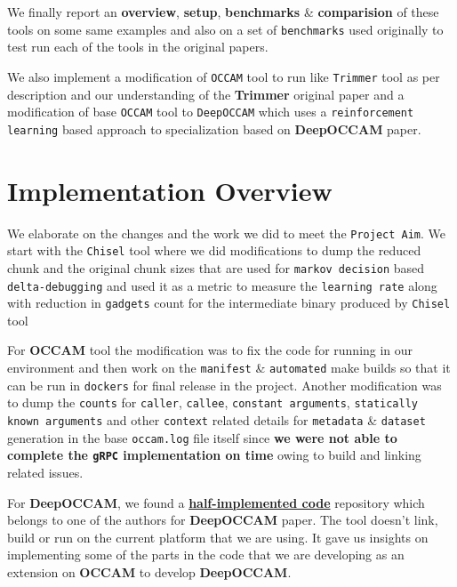 \documentclass{relatorio}
\begin{document}
We finally report an \textbf{overview}, \textbf{setup}, \textbf{benchmarks} \& \textbf{comparision} of these tools on some same 
examples and also on a set of \texttt{benchmarks} used originally to test run each of the tools in the original papers. 

We also implement a modification of \texttt{OCCAM} tool to run like \texttt{Trimmer} tool as per description and our understanding 
of the \textbf{Trimmer} original paper and a modification of base \texttt{OCCAM} tool to \texttt{DeepOCCAM} which uses a 
\texttt{reinforcement learning} based approach to specialization based on \textbf{DeepOCCAM} paper. 

\section{Implementation Overview}%
\label{Tools}

We elaborate on the changes and the work we did to meet the \texttt{Project Aim}. We start with the \texttt{Chisel} tool where we did modifications to dump the reduced chunk and the original chunk sizes that are used for \texttt{markov decision} based \texttt{delta-debugging} and used it as a metric to measure the \texttt{learning rate} along with reduction in \texttt{gadgets} count for the intermediate binary produced by \texttt{Chisel} tool

For \textbf{OCCAM} tool the modification was to fix the code for running in our environment and then work on the \texttt{manifest} \& \texttt{automated} make builds so that it can be run in \texttt{dockers} for final release in the project. Another modification was to dump the \texttt{counts} for \texttt{caller}, \texttt{callee}, \texttt{constant arguments}, \texttt{statically known arguments} and other \texttt{context} related details for 
\texttt{metadata} \& \texttt{dataset} generation in the base \texttt{occam.log} file itself since \textbf{we were not able to complete the \texttt{gRPC} implementation on time} owing to build and linking related issues. 

For \textbf{DeepOCCAM}, we found a \textbf{\href{https://github.com/nhamlv-55/OCCAM/tree/mlpolicy}{half-implemented code}} repository which belongs to one of the authors for \textbf{DeepOCCAM} paper. The tool doesn't link, build or run on the current platform that we are using. It gave us insights on implementing some of the parts in the code that we are developing as an extension on \textbf{OCCAM} to develop \textbf{DeepOCCAM}.
\end{document}
